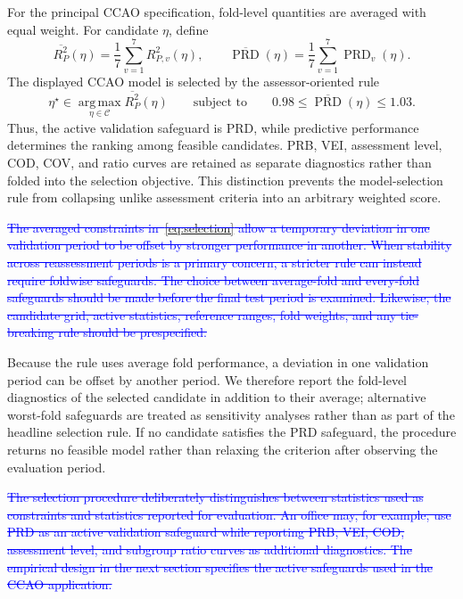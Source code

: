\documentclass[10pt]{article}
\theoremstyle{definition}
\newcommand{\1}{\mathbf{1}}
\newcommand{\argmaxop}{\operatorname*{arg\,max}}
\begin{document}
{{\textcolor{impGreen}{For the principal CCAO specification, fold-level quantities are averaged with equal weight. For candidate $\eta$, define}
{\color{impGreen}
\begin{equation}
\label{eq:ccao_validation_averages}
\overline{R^2_P}(\eta)
=
\frac{1}{7}\sum_{v=1}^{7}R^2_{P,v}(\eta),
\qquad
\overline{\operatorname{PRD}}(\eta)
=
\frac{1}{7}\sum_{v=1}^{7}\operatorname{PRD}_v(\eta).
\end{equation}
}
\textcolor{impGreen}{The displayed CCAO model is selected by the assessor-oriented rule}
{\color{impGreen}
\begin{equation}
\label{eq:ccao_selection}
\eta^\star
\in
\argmaxop_{\eta\in\mathcal C}
\overline{R^2_P}(\eta)
\qquad
\text{subject to}
\qquad
0.98
\le
\overline{\operatorname{PRD}}(\eta)
\le
1.03.
\end{equation}
}
\textcolor{impGreen}{Thus, the active validation safeguard is PRD, while predictive performance determines the ranking among feasible candidates. PRB, VEI, assessment level, COD, COV, and ratio curves are retained as separate diagnostics rather than folded into the selection objective. This distinction prevents the model-selection rule from collapsing unlike assessment criteria into an arbitrary weighted score.}

\textcolor{blue}{\sout{The averaged constraints in~\eqref{eq:selection} allow a temporary deviation in one validation period to be offset by stronger performance in another. When stability across reassessment periods is a primary concern, a stricter rule can instead require foldwise safeguards. The choice between average-fold and every-fold safeguards should be made before the final test period is examined. Likewise, the candidate grid, active statistics, reference ranges, fold weights, and any tie-breaking rule should be prespecified.}}

\textcolor{impGreen}{Because the rule uses average fold performance, a deviation in one validation period can be offset by another period. We therefore report the fold-level diagnostics of the selected candidate in addition to their average; alternative worst-fold safeguards are treated as sensitivity analyses rather than as part of the headline selection rule. If no candidate satisfies the PRD safeguard, the procedure returns no feasible model rather than relaxing the criterion after observing the evaluation period.}

\textcolor{blue}{\sout{The selection procedure deliberately distinguishes between statistics used as constraints and statistics reported for evaluation. An office may, for example, use PRD as an active validation safeguard while reporting PRB, VEI, COD, assessment level, and subgroup ratio curves as additional diagnostics. The empirical design in the next section specifies the active safeguards used in the CCAO application.}}

}}
\end{document}
